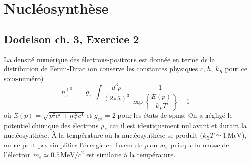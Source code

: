 \documentclass{article}
\numberwithin{equation}{section}
\begin{document}
\section{Nucléosynthèse}
\subsection{Dodelson ch. 3, Exercice 2}
La densité numérique des électrons-positrons est donnée en terme de la distribution 
de Fermi-Dirac (on conserve les constantes physiques $c,\, \hbar,\, k_B$ pour ce 
sous-numéro):
\begin{equation}\label{eq:nelectron} 
        n_{e^\pm}^{(0)} = g_{e^\pm}\int \frac{d^3p}{(2 \pi \hbar)^{3}} 
        \frac{1}{\exp \left\{ \dfrac{E(p)}{k_B T} \right\} + 1}
\end{equation} 
où $E(p) = \sqrt{p^2 c^2 + m_e^2c^4}$ et $g_{e^\pm} = 2$ pour les états de spins. 
On a négligé le potentiel chimique des électrons $\mu_e$ car il est 
identiquement nul avant et durant la nucléosynthèse.
À la 
température où la nucléosynthèse se produit ($k_BT \simeq 1\, \text{MeV}$), on ne 
peut pas simplifier l'énergie en faveur de $p$ ou $m_e$ puisque la masse de l'électron
$m_e \simeq 0.5\, \text{MeV}/c^2$ est similaire à la température. 
\end{document}

